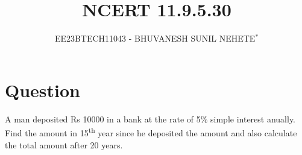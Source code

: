 \documentclass[journal,12pt,twocolumn]{IEEEtran}
\theoremstyle{remark}
\begin{document}

\vspace{3cm}

\title{NCERT 11.9.5.30}
\author{EE23BTECH11043 - BHUVANESH SUNIL NEHETE$^{*}$%
}
\maketitle
\newpage
\bigskip

\renewcommand{\thefigure}{\theenumi}
\renewcommand{\thetable}{\theenumi}



\section*{Question}
A man deposited Rs 10000 in a bank at the rate of 5\% simple interest anually. Find the amount in 15\textsuperscript{th} year since he deposited the amount and also calculate the total amount after 20 years.
\end{document}
